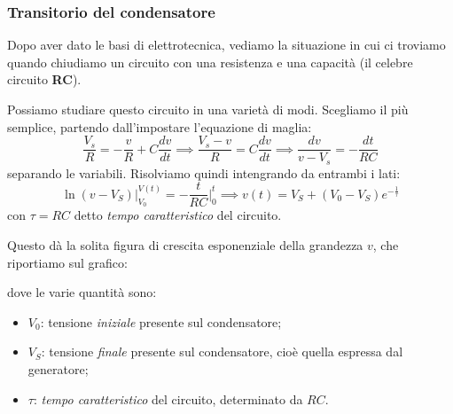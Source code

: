 \documentclass[a4paper,11pt]{article}
\begin{document}
\subsubsection{Transitorio del condensatore}
Dopo aver dato le basi di elettrotecnica, vediamo la situazione in cui ci troviamo quando chiudiamo un circuito con una resistenza e una capacità (il celebre circuito \textbf{RC}).

\begin{center}
\end{center}

Possiamo studiare questo circuito in una varietà di modi. Scegliamo il più semplice, partendo dall'impostare l'equazione di maglia:
$$
\frac{V_s}{R} = -\frac{v}{R} + C \frac{dv}{dt} \implies \frac{V_s - v}{R} = C \frac{dv}{dt} \implies \frac{dv}{v - V_s} = - \frac{dt}{RC}
$$
separando le variabili. Risolviamo quindi intengrando da entrambi i lati:
$$
\ln (v - V_S) \Big|_{V_0}^{V(t)} = -\frac{t}{RC} \Big|_0^t \implies v(t) = V_S + (V_0 - V_S)e^{-\frac{1}{\tau}}
$$
con $\tau = RC$ detto \textit{tempo caratteristico} del circuito.

Questo dà la solita figura di crescita esponenziale della grandezza $v$, che riportiamo sul grafico:
\begin{center}
\end{center}
dove le varie quantità sono:
\begin{itemize}
	\item $V_0$: tensione \textit{iniziale} presente sul condensatore;
	\item $V_S$: tensione \textit{finale} presente sul condensatore, cioè quella espressa dal generatore;
	\item $\tau$: \textit{tempo caratteristico} del circuito, determinato da $RC$.
\end{itemize}
\end{document}

